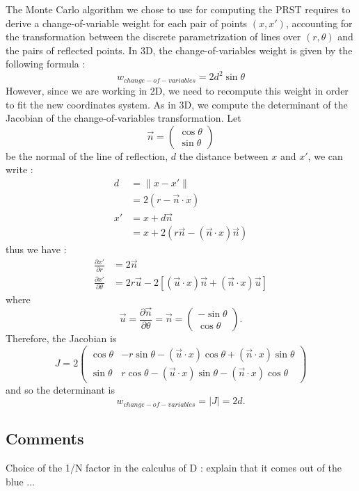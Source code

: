 \documentclass[10pt,a4paper]{article}			%
\begin{document}
The Monte Carlo algorithm we chose to use for computing the PRST requires to derive a change-of-variable weight for each pair of points $(x,x')$, accounting for the transformation between the discrete parametrization of lines over $(r,\theta)$ and the pairs of reflected points. In 3D, the change-of-variables weight is given by the following formula :
\[w_{change-of-variables} = 2d^2\sin\theta\]
However, since we are working in 2D, we need to recompute this weight in order to fit the new coordinates system. As in 3D, we compute the determinant of the Jacobian of the change-of-variables transformation. Let 
\[\vec{n}=\begin{pmatrix}\cos\theta \\ \sin\theta\end{pmatrix}\]
be the normal of the line of reflection, $d$ the distance between $x$ and $x'$, we can write :
\begin{align*}
 d & = \lVert x-x' \rVert  \\
& = 2(r-\vec{n}\cdot x) \\
x' &= x+ d\vec{n}\\
&= x+ 2(r\vec{n} - (\vec{n}\cdot x)\vec{n})
\end{align*}
thus we have :
\begin{align*}
\frac{\partial x'}{\partial r}&=2\vec{n}\\
\frac{\partial x'}{\partial \theta}&= 2r\vec{u}-2[(\vec{u}\cdot x)\vec{n}+(\vec{n}\cdot x)\vec{u}]
\end{align*}
where 
\[\vec{u}=\frac{\partial \vec{n}}{\partial \theta} = \vec{n}=\begin{pmatrix}-\sin\theta \\ \cos\theta\end{pmatrix}.\]
Therefore, the Jacobian is
\[J = 2
\begin{pmatrix}
\cos\theta & -r\sin\theta-(\vec{u}\cdot x)\cos\theta+(\vec{n}\cdot x)\sin\theta\\
\sin\theta &  r \cos\theta - (\vec{u}\cdot x)\sin\theta - (\vec{n}\cdot x)\cos\theta
\end{pmatrix}\]
and so the determinant is
\[w_{change-of-variables} = |J| = 2d.\]

  	\subsection{Comments}
  	Choice of the 1/N factor in the calculus of D : explain that it comes out of the blue ... \\
  	
\end{document}
